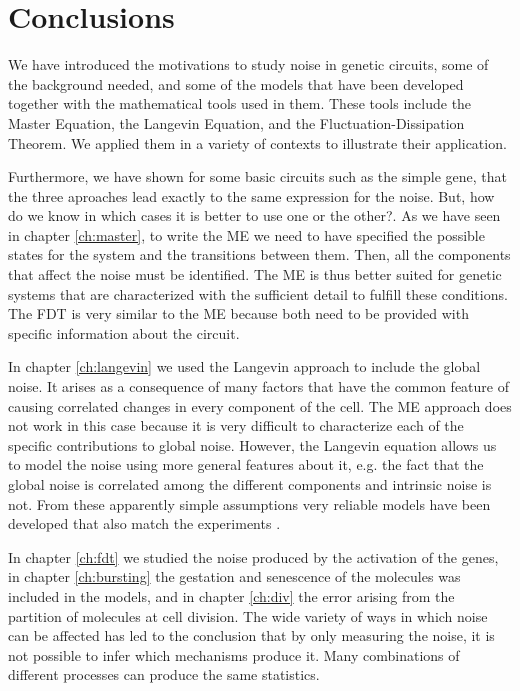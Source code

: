 \chapter*{Conclusions}

We have introduced the motivations to study noise in genetic circuits, some of the background needed, and some of the models that have been developed together with the mathematical tools used in them. These tools include the Master Equation, the Langevin Equation, and the Fluctuation-Dissipation Theorem. We applied them in a variety of contexts to illustrate their application.

Furthermore, we have shown for some basic circuits such as the simple gene, that the three aproaches lead exactly to the same expression for the noise. But, how do we know in which cases it is better to use one or the other?. As we have seen in chapter \ref{ch:master}, to write the ME we need to have specified the possible states for the system and the transitions between them. Then, all the components that affect the noise must be identified. The ME is thus better suited for genetic systems that are characterized with the sufficient detail to fulfill these conditions. The FDT is very similar to the ME because both need to be provided with specific information about the circuit.

In chapter \ref{ch:langevin} we used the Langevin approach to include the global noise. It arises as a consequence of many factors that have the common feature of causing correlated changes in every component of the cell. The ME approach does not work in this case because it is very difficult to characterize each of the specific contributions to global noise. However, the Langevin equation allows us to model the noise using more general features about it, e.g. the fact that the global noise is correlated among the different components and intrinsic noise is not. From these apparently simple assumptions very reliable models have been developed that also match the experiments \cite{pedraza05}.

In chapter \ref{ch:fdt} we studied the noise produced by the activation of the genes, in chapter \ref{ch:bursting} the gestation and senescence of the molecules was included in the models, and in chapter \ref{ch:div} the error arising from the partition of molecules at cell division. The wide variety of ways in which noise can be affected has led to the conclusion that by only measuring the noise, it is not possible to infer which mechanisms produce it. Many combinations of different processes can produce the same statistics.

